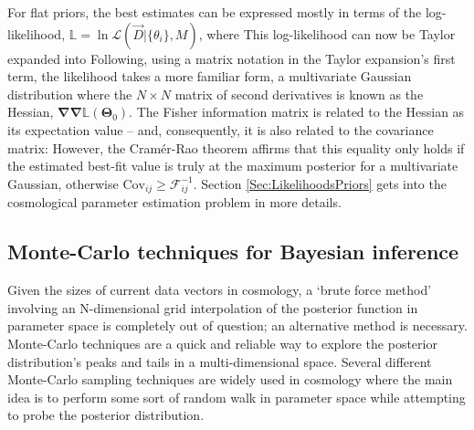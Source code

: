 \qquad For flat priors, the best estimates can be expressed mostly in terms of the log-likelihood, $\mathbb{L} = \ln \mathcal{L}(\vec{D}|\{\theta_i\},M)$, where 
This log-likelihood can now be Taylor expanded into
Following, using a matrix notation in the Taylor expansion's first term, the likelihood takes a more familiar form,
a multivariate Gaussian distribution where the $N\times N$ matrix of second derivatives is known as the Hessian, $\bm{\nabla\nabla}\mathbb{L}(\mathbf{\Theta}_0)$. The Fisher information matrix is related to the Hessian as its expectation value -- and, consequently, it is also related to the covariance matrix:
However, the Cram\'er-Rao theorem affirms that this equality only holds if the estimated best-fit value is truly at the maximum posterior for a multivariate Gaussian, otherwise $\text{Cov}_{ij} \geq \mathcal{F}^{-1}_{ij}$. Section \ref{Sec:LikelihoodsPriors} gets into the cosmological parameter estimation problem in more details.

\subsection{Monte-Carlo techniques for Bayesian inference}\label{Sec:Sampling}
Given the sizes of current data vectors in cosmology, a `brute force method' involving an N-dimensional grid interpolation of the posterior function in parameter space is completely out of question; an alternative method is necessary. Monte-Carlo techniques are a quick and reliable way to explore the posterior distribution's peaks and tails in a multi-dimensional space. Several different Monte-Carlo sampling techniques are widely used in cosmology where the main idea is to perform some sort of random walk in parameter space while attempting to probe the posterior distribution. 


